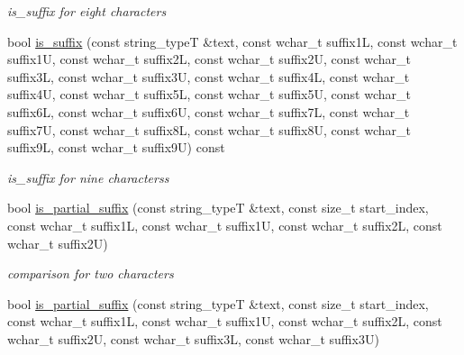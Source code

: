 \begin{DoxyCompactItemize}
\begin{DoxyCompactList}\small\item\em is\+\_\+suffix for eight characters \end{DoxyCompactList}\item 
\hypertarget{classstemming_1_1stem_ab905150e381f068c6b04eba851bb6263}{bool \hyperlink{classstemming_1_1stem_ab905150e381f068c6b04eba851bb6263}{is\+\_\+suffix} (const string\+\_\+type\+T \&text, const wchar\+\_\+t suffix1\+L, const wchar\+\_\+t suffix1\+U, const wchar\+\_\+t suffix2\+L, const wchar\+\_\+t suffix2\+U, const wchar\+\_\+t suffix3\+L, const wchar\+\_\+t suffix3\+U, const wchar\+\_\+t suffix4\+L, const wchar\+\_\+t suffix4\+U, const wchar\+\_\+t suffix5\+L, const wchar\+\_\+t suffix5\+U, const wchar\+\_\+t suffix6\+L, const wchar\+\_\+t suffix6\+U, const wchar\+\_\+t suffix7\+L, const wchar\+\_\+t suffix7\+U, const wchar\+\_\+t suffix8\+L, const wchar\+\_\+t suffix8\+U, const wchar\+\_\+t suffix9\+L, const wchar\+\_\+t suffix9\+U) const }\label{classstemming_1_1stem_ab905150e381f068c6b04eba851bb6263}

\begin{DoxyCompactList}\small\item\em is\+\_\+suffix for nine characterss \end{DoxyCompactList}\item 
\hypertarget{classstemming_1_1stem_a2ae63cf92bc4f4f40f0093e4842a235f}{bool \hyperlink{classstemming_1_1stem_a2ae63cf92bc4f4f40f0093e4842a235f}{is\+\_\+partial\+\_\+suffix} (const string\+\_\+type\+T \&text, const size\+\_\+t start\+\_\+index, const wchar\+\_\+t suffix1\+L, const wchar\+\_\+t suffix1\+U, const wchar\+\_\+t suffix2\+L, const wchar\+\_\+t suffix2\+U)}\label{classstemming_1_1stem_a2ae63cf92bc4f4f40f0093e4842a235f}

\begin{DoxyCompactList}\small\item\em comparison for two characters \end{DoxyCompactList}\item 
\hypertarget{classstemming_1_1stem_a728ea4e26737b04d04e02bea863f29e4}{bool \hyperlink{classstemming_1_1stem_a728ea4e26737b04d04e02bea863f29e4}{is\+\_\+partial\+\_\+suffix} (const string\+\_\+type\+T \&text, const size\+\_\+t start\+\_\+index, const wchar\+\_\+t suffix1\+L, const wchar\+\_\+t suffix1\+U, const wchar\+\_\+t suffix2\+L, const wchar\+\_\+t suffix2\+U, const wchar\+\_\+t suffix3\+L, const wchar\+\_\+t suffix3\+U)}\label{classstemming_1_1stem_a728ea4e26737b04d04e02bea863f29e4}


\end{DoxyCompactItemize}
